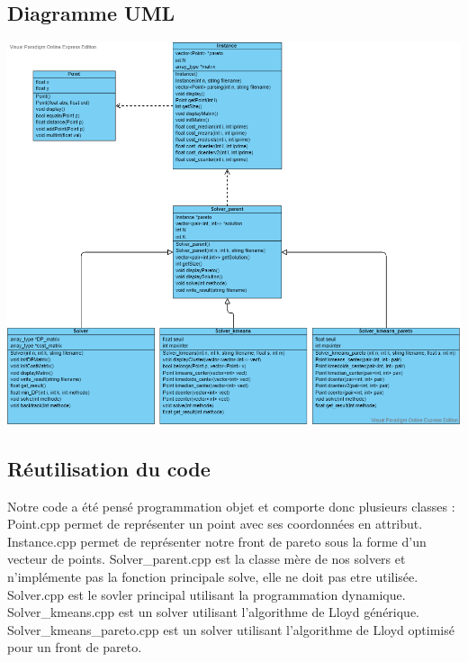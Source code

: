 ﻿\documentclass{meta}
\begin{document}
{\subsection{Diagramme UML}
\includegraphics[scale=0.5]{TER.png}

\subsection{Réutilisation du code}

Notre code a été pensé programmation objet et comporte donc plusieurs classes : Point.cpp permet de représenter un point avec ses coordonnées en attribut. Instance.cpp permet de représenter notre front de pareto sous la forme d'un vecteur de points. Solver\_parent.cpp est la classe mère de nos solvers et n'implémente pas la fonction principale solve, elle ne doit pas etre utilisée. Solver.cpp est le sovler principal utilisant la programmation dynamique. Solver\_kmeans.cpp est un solver utilisant l'algorithme de Lloyd générique. Solver\_kmeans\_pareto.cpp est un solver utilisant l'algorithme de Lloyd optimisé pour un front de pareto.\\

}
\end{document}
